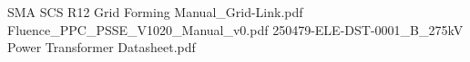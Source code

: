 \renewcommand\bibname{References}

\begin{thebibliography}{99}
	SMA SCS R12 Grid Forming Manual_Grid-Link.pdf
	Fluence_PPC_PSSE_V1020_Manual_v0.pdf
	250479-ELE-DST-0001_B_275kV Power Transformer Datasheet.pdf
	
\end{thebibliography}